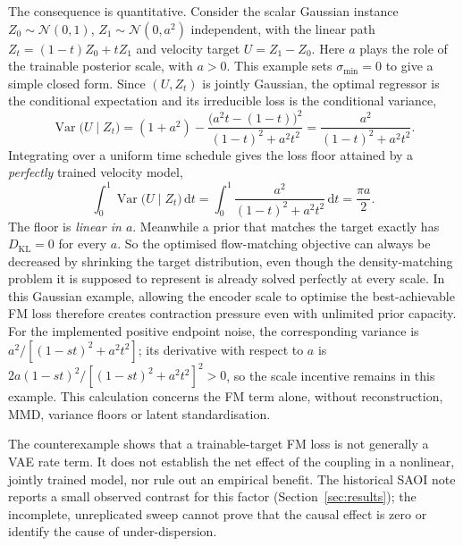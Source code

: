The consequence is quantitative. Consider the scalar Gaussian instance
$Z_0\sim\mathcal{N}(0,1)$, $Z_1\sim\mathcal{N}(0,a^2)$ independent, with the
linear path $Z_t=(1-t)Z_0+tZ_1$ and velocity target $U=Z_1-Z_0$. Here $a$
plays the role of the trainable posterior scale, with $a>0$. This example
sets $\sigma_{\min}=0$ to give a simple closed form. Since $(U,Z_t)$ is jointly
Gaussian, the optimal regressor is the conditional expectation and its
irreducible loss is the conditional variance,
\begin{equation}
  \operatorname{Var}\bigl(U \mid Z_t\bigr)
  = (1+a^2) - \frac{\bigl(a^2t-(1-t)\bigr)^2}{(1-t)^2+a^2t^2}
  = \frac{a^2}{(1-t)^2+a^2t^2}.
  \label{eq:cond-var}
\end{equation}
Integrating over a uniform time schedule gives the loss floor attained by a
\emph{perfectly} trained velocity model,
\begin{equation}
  \int_0^1 \operatorname{Var}\bigl(U\mid Z_t\bigr)\,\mathrm{d}t
  = \int_0^1 \frac{a^2}{(1-t)^2+a^2t^2}\,\mathrm{d}t
  = \frac{\pi a}{2}.
  \label{eq:floor}
\end{equation}
The floor is \emph{linear in $a$}. Meanwhile a prior that matches the target
exactly has $D_{\mathrm{KL}}=0$ for every $a$. So the optimised flow-matching
objective can always be decreased by shrinking the target distribution, even
though the density-matching problem it is supposed to represent is already
solved perfectly at every scale. In this Gaussian example, allowing the
encoder scale to optimise the best-achievable FM loss therefore creates
contraction pressure even with unlimited prior capacity. For the implemented
positive endpoint noise, the corresponding variance is
$a^2/[(1-st)^2+a^2t^2]$; its derivative with respect to $a$ is
$2a(1-st)^2/[(1-st)^2+a^2t^2]^2>0$, so the scale incentive remains in this
example. This calculation concerns the FM term alone, without reconstruction,
MMD, variance floors or latent standardisation.

The counterexample shows that a trainable-target FM loss is not generally a
VAE rate term. It does not establish the net effect of the coupling in a
nonlinear, jointly trained model, nor rule out an empirical benefit. The
historical SAOI note reports a small observed contrast for this factor
(Section~\ref{sec:results}); the incomplete, unreplicated sweep cannot prove
that the causal effect is zero or identify the cause of under-dispersion.
